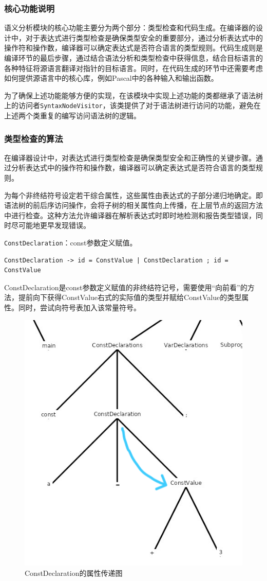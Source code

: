 \documentclass[../main.tex]{subfiles}
\begin{document}
\subsubsection{核心功能说明}

语义分析模块的核心功能主要分为两个部分：类型检查和代码生成。在编译器的设计中，对于表达式进行类型检查是确保类型安全的重要部分，通过分析表达式中的操作符和操作数，编译器可以确定表达式是否符合语言的类型规则。代码生成则是编译环节的最后步骤，通过结合语法分析和类型检查中获得信息，结合目标语言的各种特征将源语言翻译对指针的目标语言。同时，在代码生成的环节中还需要考虑如何提供源语言中的核心库，例如Pascal中的各种输入和输出函数。

为了确保上述功能能够方便的实现，在该模块中实现上述功能的类都继承了语法树上的访问者\texttt{SyntaxNodeVisitor}，该类提供了对于语法树进行访问的功能，避免在上述两个类重复的编写访问语法树的逻辑。

\subsubsection{类型检查的算法}
在编译器设计中，对表达式进行类型检查是确保类型安全和正确性的关键步骤。通过分析表达式中的操作符和操作数，编译器可以确定表达式是否符合语言的类型规则。

为每个非终结符号设定若干综合属性，这些属性由表达式的子部分递归地确定。即语法树的前后序访问操作，会将子树的相关属性向上传播，在上层节点的返回方法中进行检查。这种方法允许编译器在解析表达式时即时地检测和报告类型错误，同时尽可能地更早发现错误。

\texttt{ConstDeclaration}：const参数定义赋值。

\begin{lstlisting}[style=csharp]
ConstDeclaration -> id = ConstValue | ConstDeclaration ; id = ConstValue
\end{lstlisting}

ConstDeclaration是const参数定义赋值的非终结符记号，需要使用“向前看”的方法，提前向下获得ConstValue右式的实际值的类型并赋给ConstValue的类型属性。同时，尝试向符号表加入该常量符号。

\begin{figure}[h]
\centering
\includegraphics[width=0.4\linewidth]{assets/类型检查/constDeclaration.png}
\caption{ConstDeclaration的属性传递图}
\label{fig:ConstDeclaration}
\end{figure}
\end{document}
